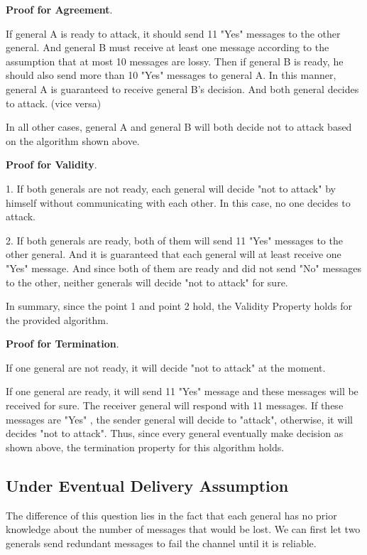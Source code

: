 \documentclass[11pt,a4paper]{article}
\begin{document}
\textbf{Proof for Agreement}. 

If general A is ready to attack, it should send 11 "Yes" messages to
the other general. And general B must receive at least one message
according to the assumption that at most 10 messages are lossy. Then if
general B is ready, he should also send more than 10 "Yes" messages to general A.
In this manner, general A is guaranteed to receive general B's decision. And
both general decides to attack. (vice versa)

In all other cases, general A and general B will both decide not to attack
based on the algorithm shown above.

\textbf{Proof for Validity}. 

1. If both generals are not ready, each general will decide "not to attack"
by himself without communicating with each other. In this case, no one decides
to attack.

2. If both generals are ready, both of them will send 11 "Yes" messages to the other
general. And it is guaranteed that each general will at least receive one
"Yes" message. And since both of them are ready and did not send "No" messages
to the other, neither generals will decide "not to attack" for sure. 

In summary, since the point 1 and point 2 hold, the Validity Property
holds for the provided algorithm.

\textbf{Proof for Termination}. 

If one general are not ready, it will decide "not to attack" at the moment. 

If one general are ready, it will send 11 "Yes" message and these messages
will be received for sure. The receiver general will respond with 11 messages.
If these messages are "Yes" , the sender general will decide to "attack",
otherwise, it will decides "not to attack".  Thus, since every general
eventually make decision as shown above, the termination property for this
algorithm holds. 

\newpage%

\subsection{Under Eventual Delivery Assumption}
The difference of this question lies in the fact that each general has no
prior knowledge about the number of messages that would be lost. We can
first let two generals send redundant messages to fail the channel until it is
reliable. 
\end{document}
